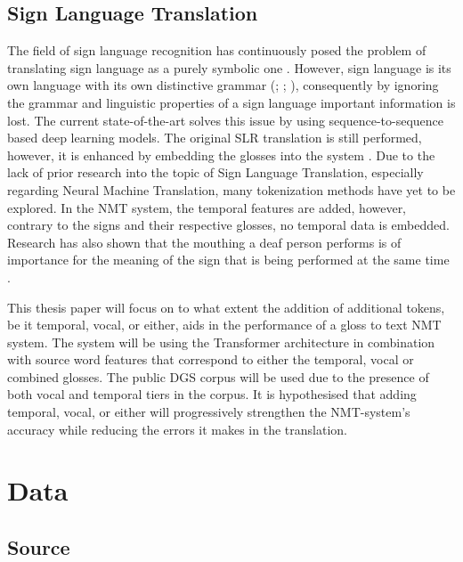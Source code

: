 \subsection{Sign Language Translation}

The field of sign language recognition has continuously posed the problem of translating sign language as a purely symbolic one \cite{camgoz2018neural}. However, sign language is its own language with its own distinctive grammar (\citealp{perniss2007}; \citealp{camgoz2018neural}; \citealp{camgoz2020sign}), consequently by ignoring the grammar and linguistic properties of a sign language important information is lost. The current state-of-the-art solves this issue by using sequence-to-sequence based deep learning models. The original SLR translation is still performed, however, it is enhanced by embedding the glosses into the system \cite{camgoz2018neural}. Due to the lack of prior research into the topic of Sign Language Translation, especially regarding Neural Machine Translation, many tokenization methods have yet to be explored. In the NMT system, the temporal features are added, however, contrary to the signs and their respective glosses, no temporal data is embedded. Research has also shown that the mouthing a deaf person performs is of importance for the meaning of the sign that is being performed at the same time \cite{kristoffersen2016designing}.

This thesis paper will focus on to what extent the addition of additional tokens, be it temporal, vocal, or either, aids in the performance of a gloss to text NMT system. The system will be using the Transformer architecture in combination with source word features \cite{garcia2016factored} that correspond to either the temporal, vocal or combined glosses. The public DGS corpus \cite{dgscorpus_3} will be used due to the presence of both vocal and temporal tiers in the corpus. It is hypothesised that adding temporal, vocal, or either will progressively strengthen the NMT-system's accuracy while reducing the errors it makes in the translation.


\section{Data}


\subsection{Source}

